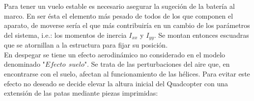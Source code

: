 \documentclass[twoside,11pt]{book}
\begin{document}
Para tener un vuelo estable es necesario asegurar la sugeción de la batería al marco. En ser ésta el elemento más pesado de todos de los que componen el aparato, de moverse sería el que más contribuiría en un cambio de los parámetros del sistema, i.e.: los momentos de inercia $I_{xx}$ y $I_{yy}$. Se montan entonces escuadras que se atornillan a la estructura para fijar su posición. \\

En despegar se tiene un efecto aerodinámico no considerado en el modelo denominado "$Efecto \>\> suelo$". Se trata de las perturbaciones del aire que, en encontrarse con el suelo, afectan al funcionamiento de las hélices. Para evitar este efecto no deseado se decide elevar la altura inicial del Quadcopter con una extensión de las patas mediante piezas imprimidas: \\
\end{document}
